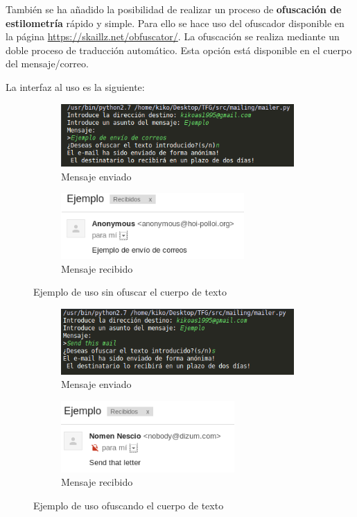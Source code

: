 También se ha añadido la posibilidad de realizar un proceso de \textbf{ofuscación de estilometría} rápido y simple. Para ello se hace uso del ofuscador disponible en la página \url{https://skaillz.net/obfuscator/}. La ofuscación se realiza mediante un doble proceso de traducción automático. 
Esta opción está disponible en el cuerpo del mensaje/correo.

La interfaz al uso es la siguiente:

\begin{figure}[H]
	\centering
	\begin{subfigure}{0.5\textwidth}
		\centering
		\mbox{\includegraphics[width=3.50in]{images/sin_ofuscar.png}}
		\caption{Mensaje enviado}
		\label{fig:sub1}
	\end{subfigure}%
	\begin{subfigure}{0.5\textwidth}
		\centering
		\mbox{\includegraphics[width=2.75in]{images/recibido_sin.png}}
		\caption{Mensaje recibido}
		\label{fig:sub2}
	\end{subfigure}
	\caption{Ejemplo de uso sin ofuscar el cuerpo de texto}
	\label{fig:mailer}
\end{figure}

\begin{figure}[H]
	\centering
	\begin{subfigure}{0.5\textwidth}
		\centering
		\mbox{\includegraphics[width=3.50in]{images/con_ofuscar.png}}
		\caption{Mensaje enviado}
		\label{fig:sub1}
	\end{subfigure}%
	\begin{subfigure}{0.5\textwidth}
		\centering
		\mbox{\includegraphics[width=2.6in]{images/recibido_con.png}}
		\caption{Mensaje recibido}
		\label{fig:sub2}
	\end{subfigure}
	\caption{Ejemplo de uso ofuscando el cuerpo de texto}
	\label{fig:mailer}
\end{figure}

